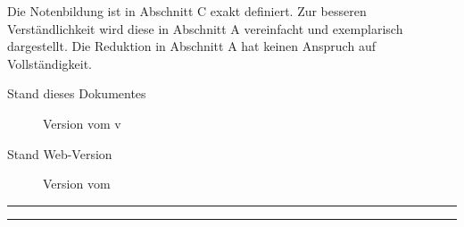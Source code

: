 \documentclass{article}
\newcommand{\versiondir}{_version}
\begin{document}
	\vspace*{-1cm}
	Die Notenbildung ist in Abschnitt C exakt definiert. Zur besseren Verständlichkeit wird diese in Abschnitt A vereinfacht und exemplarisch dargestellt. Die Reduktion in Abschnitt A hat keinen Anspruch auf Vollständigkeit.

	\begin{description}
		\item[Stand dieses Dokumentes] Version  vom v
		\item[Stand Web-Version] Version  vom 
	\end{description}
		
	\rule{\linewidth}{2pt}
	\renewcommand{\contentsname}{Abschnitte der Notentransparenz}
	\tableofcontents
	\rule{\linewidth}{2pt}
	
	
	
	\vspace{0.2cm}

	

	\clearpage
	
\end{document}
